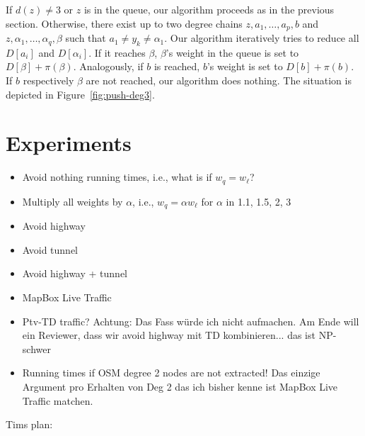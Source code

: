 \documentclass[a4paper,UKenglish,cleveref, autoref]{lipics-v2019}
\begin{document}
If $d(z)\neq 3$ or $z$ is in the queue, our algorithm proceeds as in the previous section.
Otherwise, there exist up to two degree chains $z,a_1,\ldots,a_p,b$ and $z,\alpha_1,\ldots,\alpha_q,\beta$ such that $a_1\neq y_k \neq \alpha_1$.
Our algorithm iteratively tries to reduce all $D[a_i]$ and $D[\alpha_i]$.
If it reaches $\beta$, $\beta$'s weight in the queue is set to $D[\beta]+\pi(\beta)$.
Analogously, if $b$ is reached, $b$'s weight is set to $D[b]+\pi(b)$.
If $b$ respectively $\beta$ are not reached, our algorithm does nothing.
The situation is depicted in Figure~\ref{fig:push-deg3}.


\section{Experiments}

\begin{itemize}
\item Avoid nothing running times, i.e., what is if $w_q = w_\ell$?
\item Multiply all weights by $\alpha$, i.e., $w_q = \alpha w_\ell$ for $\alpha$ in 1.1, 1.5, 2, 3
\item Avoid highway
\item Avoid tunnel
\item Avoid highway + tunnel
\item MapBox Live Traffic
\item Ptv-TD traffic? Achtung: Das Fass würde ich nicht aufmachen. Am Ende will ein Reviewer, dass wir avoid highway mit TD kombinieren... das ist NP-schwer
\item Running times if OSM degree 2 nodes are not extracted! Das einzige Argument pro Erhalten von Deg 2 das ich bisher kenne ist MapBox Live Traffic matchen.
\end{itemize}

Tims plan:
\end{document}
